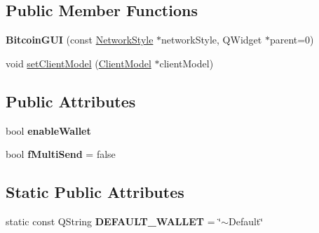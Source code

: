 \subsection*{Public Member Functions}
\begin{DoxyCompactItemize}
\item 
\mbox{\label{class_bitcoin_g_u_i_a2598b4ffab4a206877bee80916cc775c}} 
{\bfseries Bitcoin\+G\+UI} (const \mbox{\hyperlink{class_network_style}{Network\+Style}} $\ast$network\+Style, Q\+Widget $\ast$parent=0)
\item 
void \mbox{\hyperlink{class_bitcoin_g_u_i_a99d71e1f8478ab937ce2522c8d3815e3}{set\+Client\+Model}} (\mbox{\hyperlink{class_client_model}{Client\+Model}} $\ast$client\+Model)
\end{DoxyCompactItemize}
\subsection*{Public Attributes}
\begin{DoxyCompactItemize}
\item 
\mbox{\label{class_bitcoin_g_u_i_abc2a8a6cce2f0fb9cd56eeaea0ef48cf}} 
bool {\bfseries enable\+Wallet}
\item 
\mbox{\label{class_bitcoin_g_u_i_ab188e3f31bda6bc0f26d6b32b42f8760}} 
bool {\bfseries f\+Multi\+Send} = false
\end{DoxyCompactItemize}
\subsection*{Static Public Attributes}
\begin{DoxyCompactItemize}
\item 
\mbox{\label{class_bitcoin_g_u_i_ad488e6a1dd9f7d2172e32f41d9d14c3c}} 
static const Q\+String {\bfseries D\+E\+F\+A\+U\+L\+T\+\_\+\+W\+A\+L\+L\+ET} = \char`\"{}$\sim$Default\char`\"{}
\end{DoxyCompactItemize}

